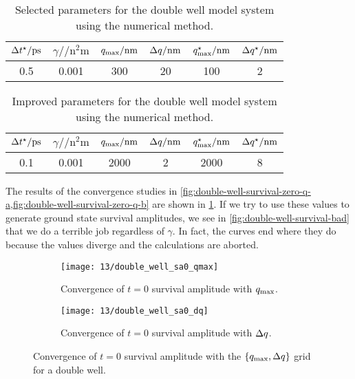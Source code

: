 \begin{table}[h]
	\begin{center}
	\begin{tabular}{ c c c c c c }
		\toprule
		{$\dt\alt / \si{\pico\second}$} & {$\gamma / \si{\per\square\nano\meter}$} & {$q_\mathrm{max} / \si{\nano\meter}$} & {$\Delta q / \si{\nano\meter}$} & {$q_\mathrm{max}^\star / \si{\nano\meter}$} & {$\Delta q^\star / \si{\nano\meter}$} \\
		\midrule
		0.5 & 0.001 & 300 & 20 & 100 & 2 \\
		\bottomrule
	\end{tabular}
	\end{center}
	\caption[
		Selected parameters for double well (numerical)
	]{
		Selected parameters for the double well model system using the numerical method.
	}
	\label{tab:model-sa0-double-well}
\end{table}

\begin{table}[h]
	\begin{center}
	\begin{tabular}{ c c c c c c }
		\toprule
		{$\dt\alt / \si{\pico\second}$} & {$\gamma / \si{\per\square\nano\meter}$} & {$q_\mathrm{max} / \si{\nano\meter}$} & {$\Delta q / \si{\nano\meter}$} & {$q_\mathrm{max}^\star / \si{\nano\meter}$} & {$\Delta q^\star / \si{\nano\meter}$} \\
		\midrule
		0.1 & 0.001 & 2000 & 2 & 2000 & 8 \\
		\bottomrule
	\end{tabular}
	\end{center}
	\caption[
		Improved parameters for double well (numerical)
	]{
		Improved parameters for the double well model system using the numerical method.
	}
	\label{tab:model-sas-double-well}
\end{table}

The results of the convergence studies in \cref{fig:double-well-survival-zero-q-a,fig:double-well-survival-zero-q-b} are shown in \cref{tab:model-sa0-double-well}.
If we try to use these values to generate ground state survival amplitudes, we see in \cref{fig:double-well-survival-bad} that we do a terrible job regardless of $\gamma$.
In fact, the curves end where they do because the values diverge and the calculations are aborted.

\begin{figure}
	\setlength{\figspacing}{5 mm}
	\centering
	\begin{subfigure}[b]{\textwidth}
		\texttt{[image: 13/double\_well\_sa0\_qmax]}
		\caption{
			Convergence of $t = 0$ survival amplitude with $q_\mathrm{max}$.
		}
		\vspace{\figspacing}
	\end{subfigure}
	\begin{subfigure}[b]{\textwidth}
		\texttt{[image: 13/double\_well\_sa0\_dq]}
		\caption{
			Convergence of $t = 0$ survival amplitude with $\Delta q$.
		}
	\end{subfigure}
	\caption[
		Convergence of double well survival amplitude with position grids
	]{
		Convergence of $t = 0$ survival amplitude with the $\{ q_\mathrm{max}, \Delta q \}$ grid for a double well.
		\explainplotsazero{}
	}
	\label{fig:double-well-survival-zero-q-a}
\end{figure}

